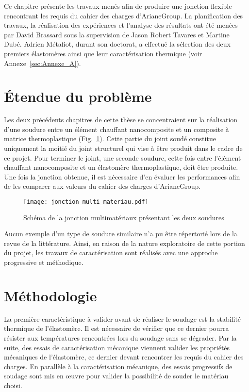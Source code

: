 \label{sec:Theme3}

Ce chapitre présente les travaux menés afin de produire une jonction flexible rencontrant les requis du cahier des charges d'ArianeGroup. 
La planification des travaux, la réalisation des expériences et l'analyse des résultats ont été menées par David Brassard sous la supervision de Jason Robert Tavares et Martine Dubé. 
Adrien Métafiot, durant son doctorat, a effectué la sélection des deux premiers élastomères ainsi que leur caractérisation thermique (voir Annexe~\ref{sec:Annexe_A}). 

\section{Étendue du problème}

Les deux précédents chapitres de cette thèse se concentraient sur la réalisation d'une soudure entre un élément chauffant nanocomposite et un composite à matrice thermoplastique \mbox{(Fig.~\ref{fig:scema_double_jonction})}. 
Cette partie du joint soudé constitue uniquement la moitié du joint structurel qui vise à être produit dans le cadre de ce projet. 
Pour terminer le joint, une seconde soudure, cette fois entre l'élément chauffant nanocomposite et un élastomère thermoplastique, doit être produite. 
Une fois la jonction obtenue, il est nécessaire d'en évaluer les performances afin de les comparer aux valeurs du cahier des charges d'ArianeGroup. 

\begin{figure}[h]
	\centering
	\texttt{[image: jonction\_multi\_materiau.pdf]}
	\caption{Schéma de la jonction multimatériaux présentant les deux soudures}
	\label{fig:scema_double_jonction}
\end{figure}

Aucun exemple d'un type de soudure similaire n'a pu être répertorié lors de la revue de la littérature. 
Ainsi, en raison de la nature exploratoire de cette portion du projet, les travaux de caractérisation sont réalisés avec une approche progressive et méthodique. 

\section{Méthodologie}

La première caractéristique à valider avant de réaliser le soudage est la stabilité thermique de l'élastomère. 
Il est nécessaire de vérifier que ce dernier pourra résister aux températures rencontrées lors du soudage sans se dégrader. 
Par la suite, des essais de caractérisation mécanique viennent valider les propriétés mécaniques de l'élastomère, ce dernier devant rencontrer les requis du cahier des charges. 
En parallèle à la caractérisation mécanique, des essais progressifs de soudage sont mis en œuvre pour valider la possibilité de souder le matériau choisi. 

